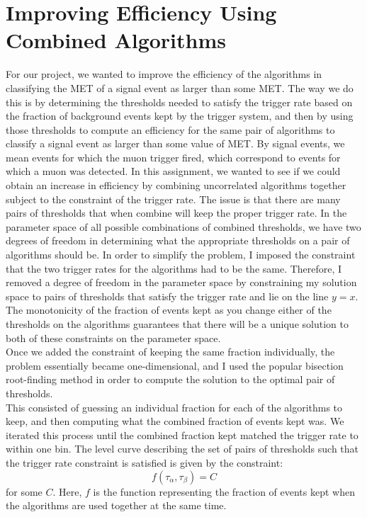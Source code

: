 \chapter{Improving Efficiency Using Combined Algorithms}
For our project, we wanted to improve the efficiency of the algorithms in classifying the MET of a signal event as larger than some MET. The way we do this is by determining the thresholds needed to satisfy the trigger rate based on the fraction of background events kept by the trigger system, and then by using those thresholds to compute an efficiency for the same pair of algorithms to classify a signal event as larger than some value of MET.
By signal events, we mean events for which the muon trigger fired, which correspond to events for which a muon was detected.
In this assignment, we wanted to see if we could obtain an increase in efficiency by combining uncorrelated algorithms together subject to the constraint of the trigger rate. The issue is that there are many pairs of thresholds that when combine will keep the proper trigger rate. In the parameter space of all possible combinations of combined thresholds, we have two degrees of freedom in determining what the appropriate thresholds on a pair of algorithms should be. 
In order to simplify the problem, I imposed the constraint that the two trigger rates for the algorithms had to be the same. Therefore, I removed a degree of freedom in the parameter space by constraining my solution space to pairs of thresholds that satisfy the trigger rate and lie on the line $y=x$. The monotonicity of the fraction of events kept as you change either of the thresholds on the algorithms guarantees that there will be a unique solution to both of these constraints on the parameter space. \\
Once we added the constraint of keeping the same fraction individually, the problem essentially became one-dimensional, and I used the popular bisection root-finding method in order to compute the solution to the optimal pair of thresholds. \\
This consisted of guessing an individual fraction for each of the algorithms to keep, and then computing what the combined fraction of events kept was. We iterated this process until the combined fraction kept matched the trigger rate to within one bin.
The level curve describing the set of pairs of thresholds such that the trigger rate constraint is satisfied is given by the constraint:
$$f(\tau_{\alpha},\tau_{\beta})=C$$
for some $C$. Here, $f$ is the function representing the fraction of events kept when the algorithms are used together at the same time. 
